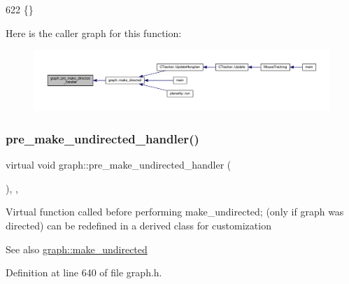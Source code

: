 \begin{DoxyCode}
622 \{\}
\end{DoxyCode}
Here is the caller graph for this function\+:
\nopagebreak
\begin{figure}[H]
\begin{center}
\leavevmode
\includegraphics[width=350pt]{classgraph_a505198f412b1e426e9d09b62ea9811e8_icgraph}
\end{center}
\end{figure}
\mbox{\label{classgraph_a8964107991e6f411ba8992f6b1deda21}} 
\subsubsection{\texorpdfstring{pre\+\_\+make\+\_\+undirected\+\_\+handler()}{pre\_make\_undirected\_handler()}}
{\footnotesize\ttfamily virtual void graph\+::pre\+\_\+make\+\_\+undirected\+\_\+handler (\begin{DoxyParamCaption}{ }\end{DoxyParamCaption})\hspace{0.3cm}{\ttfamily [inline]}, {\ttfamily [virtual]}, {\ttfamily [inherited]}}

Virtual function called before performing make\+\_\+undirected; (only if graph was directed) can be redefined in a derived class for customization

\begin{DoxySeeAlso}{See also}
\mbox{\hyperlink{classgraph_a31c8b895bd842f1b9dcc67649956cfc7}{graph\+::make\+\_\+undirected}} 
\end{DoxySeeAlso}


Definition at line 640 of file graph.\+h.


